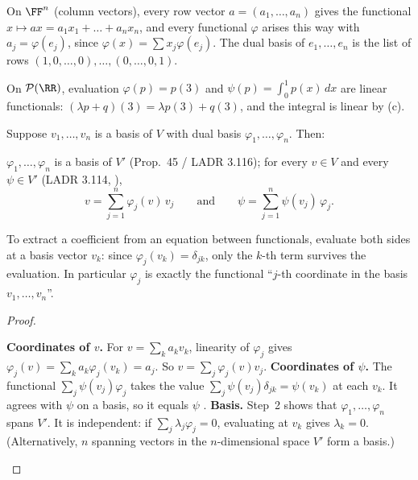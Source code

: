 \documentclass[10pt]{scrartcl}
\newcommand{\PP}{\mathcal P}\newcommand{\LL}{\mathcal L}\newcommand{\MM}{\mathcal M}\newcommand{\T}{\mathsf T}
\begin{document}
\begin{example*}
  On $\FF^n$ (column vectors), every row vector $a=(a_1,\dots,a_n)$ gives the functional $x\mapsto ax=a_1x_1+\dots+a_nx_n$, and every functional $\varphi$ arises this way with $a_j=\varphi(e_j)$, since $\varphi(x)=\sum x_j\varphi(e_j)$. The dual basis of $e_1,\dots,e_n$ is the list of rows $(1,0,\dots,0),\dots,(0,\dots,0,1)$.
\end{example*}

\begin{example*}
  On $\PP(\RR)$, evaluation $\varphi(p)=p(3)$ and $\psi(p)=\int_0^1 p(x)\,dx$ are linear functionals: $(\lambda p+q)(3)=\lambda p(3)+q(3)$, and the integral is linear by (c).
\end{example*}

\begin{proposition*}
  Suppose $v_1,\dots,v_n$ is a basis of $V$ with dual basis $\varphi_1,\dots,\varphi_n$. Then:
  \begin{enumerate}[(a)]
    \ii $\varphi_1,\dots,\varphi_n$ is a basis of $V'$ (Prop.~45 / LADR 3.116);
    \ii for every $v\in V$ and every $\psi\in V'$ (LADR 3.114, ),
    \[
      v = \sum_{j=1}^n \varphi_j(v)\,v_j \qquad\text{and}\qquad \psi = \sum_{j=1}^n \psi(v_j)\,\varphi_j.
    \]
  \end{enumerate}
\end{proposition*}
\begin{ideabox}
  To extract a coefficient from an equation between functionals, evaluate both sides at a basis vector $v_k$: since $\varphi_j(v_k)=\delta_{jk}$, only the $k$-th term survives the evaluation. In particular $\varphi_j$ is exactly the functional ``$j$-th coordinate in the basis $v_1,\dots,v_n$''.
\end{ideabox}
\begin{proof}
  \begin{steps}
    \ii \textbf{Coordinates of $v$.} For $v=\sum_k a_kv_k$, linearity of $\varphi_j$ gives $\varphi_j(v)=\sum_k a_k\varphi_j(v_k)=a_j$. So $v=\sum_j\varphi_j(v)v_j$.
    \ii \textbf{Coordinates of $\psi$.} The functional $\sum_j\psi(v_j)\varphi_j$ takes the value $\sum_j\psi(v_j)\delta_{jk}=\psi(v_k)$ at each $v_k$. It agrees with $\psi$ on a basis, so it equals $\psi$ .
    \ii \textbf{Basis.} Step~2 shows that $\varphi_1,\dots,\varphi_n$ spans $V'$. It is independent: if $\sum_j\lambda_j\varphi_j=0$, evaluating at $v_k$ gives $\lambda_k=0$. (Alternatively, $n$ spanning vectors in the $n$-dimensional space $V'$ form a basis.)
  \end{steps}
\end{proof}
\end{document}
